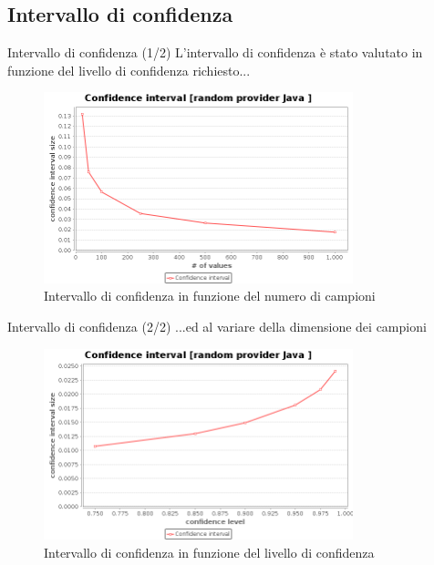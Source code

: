 \documentclass[slidestop,compress,mathserif]{beamer}
\begin{document}
\subsection{Intervallo di confidenza}
\begin{frame}{Intervallo di confidenza (1/2)}
L'intervallo di confidenza \`e stato valutato in funzione del livello di confidenza richiesto...
\begin{figure}[!h]{
	\begin{center}
	   \includegraphics[width=0.8\textwidth]{figures/IDC_1.png}
	\end{center}}
	\caption{Intervallo di confidenza in funzione del numero di campioni}
	\label{fig:idce1}
\end{figure}
\end{frame}

\begin{frame}{Intervallo di confidenza (2/2)}
...ed al variare della dimensione dei campioni
\begin{figure}[!h]{
	\begin{center}
	   \includegraphics[width=0.8\textwidth]{figures/IDC_2.png}
	\end{center}}
	\caption{Intervallo di confidenza in funzione del livello di confidenza}
	\label{fig:idc2}
\end{figure}
\end{frame}
\end{document}
